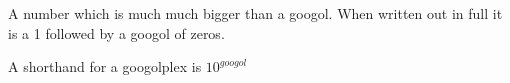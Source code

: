 A number which is much much bigger than a googol.
When written out in full it is a 1 followed by a googol of zeros. 
\par
A shorthand for a googolplex is $10^{googol}$ 